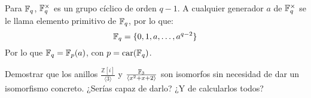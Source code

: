 \begin{observacion}
    Para $\mathbb{F}_q$, $\mathbb{F}_q^\times$ es un grupo cíclico de orden $q-1$.\newline
    A cualquier generador $a$ de $\mathbb{F}_q^\times$ se le llama elemento primitivo de $\mathbb{F}_q$, por lo que:
    \begin{equation*}
        \mathbb{F}_q = \{0, 1, a, \ldots, a^{q-2}\}
    \end{equation*}
    Por lo que $\mathbb{F}_q = \mathbb{F}_p(a)$, con $p = \operatorname{car}(\mathbb{F}_q)$.
\end{observacion}

\begin{ejercicio}
    Demostrar que los anillos $\frac{\mathbb{Z}[i]}{\langle 3 \rangle }$ y $\frac{\mathbb{F}_3}{\langle x^2+x+2 \rangle }$ son isomorfos sin necesidad de dar un isomorfismo concreto. ¿Serías capaz de darlo? ¿Y de calcularlos todos?
\end{ejercicio}

